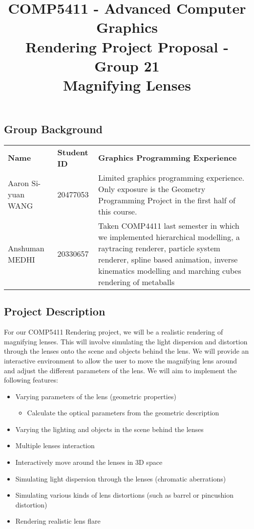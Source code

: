 \documentclass[12pt]{article}
\title{
{\LARGE COMP5411 - Advanced Computer Graphics} \\
\textbf{\LARGE Rendering Project Proposal - Group 21} \\
\textbf{\LARGE Magnifying Lenses} %
}
\date{}
\theoremstyle{remark}
\begin{document}
\maketitle\thispagestyle{fancy}
\vspace*{-4em}

\subsection*{Group Background}
\renewcommand{\arraystretch}{1.5}
\hspace*{-3em}
\begin{tabular}{L{0.2\textwidth}L{0.15\textwidth}L{0.75\textwidth}}
  \textbf{Name} & \textbf{Student ID} & \textbf{Graphics Programming Experience} \\
  Aaron Si-yuan WANG & 20477053 & Limited graphics programming experience. Only exposure is the Geometry Programming Project in the first half of this course. \\
  
  Anshuman MEDHI &20330657 & Taken COMP4411 last semester in which we implemented hierarchical modelling, a raytracing renderer, particle system renderer, spline based animation, inverse kinematics modelling and marching cubes rendering of metaballs \\
\end{tabular}
  


\subsection*{Project Description}
For our COMP5411 Rendering project, we will be a realistic rendering of magnifying lenses. This will involve simulating the light dispersion and distortion through the lenses onto the scene and objects behind the lens. 
We will provide an interactive environment to allow the user to move the magnifying lens around and adjust the different parameters of the lens. 
We will aim to implement the following features: 

\begin{itemize}
  \item Varying parameters of the lens (geometric properties)
  \begin{itemize}
    \item Calculate the optical parameters from the geometric description
  \end{itemize}
  \item Varying the lighting and objects in the scene behind the lenses
  \item Multiple lenses interaction
  \item Interactively move around the lenses in 3D space
  \item Simulating light dispersion through the lenses (chromatic aberrations)
  \item Simulating various kinds of lens distortions (such as barrel or pincushion distortion)
  \item Rendering realistic lens flare
\end{itemize}
\end{document}

